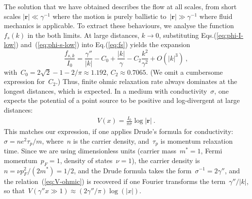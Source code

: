 \documentclass[preprint,aps,eqsecnum, prb]{revtex4-1}
\begin{document}
The solution that we have obtained describes the flow at all scales,
from short scales $|{\bm r}| \ll \gamma^{-1}$ where the motion is
purely ballistic to~$|{\bm r}| \gg \gamma^{-1}$ where fluid mechanics
is applicable. To extract these behaviours, we analyse
the function~$f_s(k)$ in the both limits.
At large distances, $k\to 0$,
substituting Eqs.(\ref{eq:phi-I-low}) and~(\ref{eq:phi-s-low})
into Eq.(\ref{eq:fs}) yields
the expansion
\begin{equation}
  \label{eq:fs-k=0}
  \frac{f_{s, k}}{I_0}
  = \frac{\gamma''}{|k|}
  - C_0
  + \frac{|k|}{\gamma}
  - C_2
  \frac{k^2}{\gamma^2} + O(|k|^3)
  \ ,
\end{equation}
with~$C_0 = 2\sqrt{2} - 1 - 2/\pi \approx 1.192$,
$C_2 \approx 0.7065$. (We omit a cumbersome expression for~$C_2$.)
Thus, finite ohmic relaxation rate
always dominates at the longest
distances, which is expected. In a medium with conductivity~$\sigma$,
one expects the potential of a point source to be positive and log-divergent
at large distances:
\begin{align}
  \label{eq:V-ohmic}
  V(x) = \frac{I_0}{\pi \sigma} \log |{\bm r}|\ .
\end{align}
This matches our expression, if one applies Drude's formula
for conductivity: $\sigma = ne^2 \tau_p/m$, where~$n$ is the carrier
density, and~$\tau_p$ is momentum relaxation time.
Since we are using dimensionless units (carrier mass~$m^\ast = 1$,
Fermi momentum~$p_F = 1$, density of states~$\nu = 1$),
the carrier density is~$n = \nu p_F^2 / (2m^\ast) = 1/2$,
and the Drude formula takes the form~$\sigma^{-1} = 2 \gamma''$,
and the relation~(\ref{eq:V-ohmic}) is recovered if
one Fourier transforms the term~$\gamma'' / |k|$,
so that~$V(\gamma'' x \gg 1) \approx (2\gamma''/\pi) \log(|x|)$.
\end{document}
